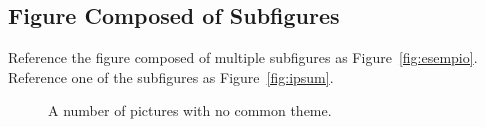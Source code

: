 \documentclass[
12pt, %
a4paper, %
oneside, %
headinclude,footinclude, %
BCOR5mm, %
german]{scrartcl}
\begin{document}

\subsection{Figure Composed of Subfigures}

Reference the figure composed of multiple subfigures as Figure~\vref{fig:esempio}. Reference one of the subfigures as Figure~\vref{fig:ipsum}. %

\lipsum[15-18] %

\begin{figure}[tb]
\centering
\caption[A number of pictures.]{A number of pictures with no common theme.} %
\label{fig:esempio}
\end{figure}


\renewcommand{\refname}{\spacedlowsmallcaps{References}} %




\end{document}

